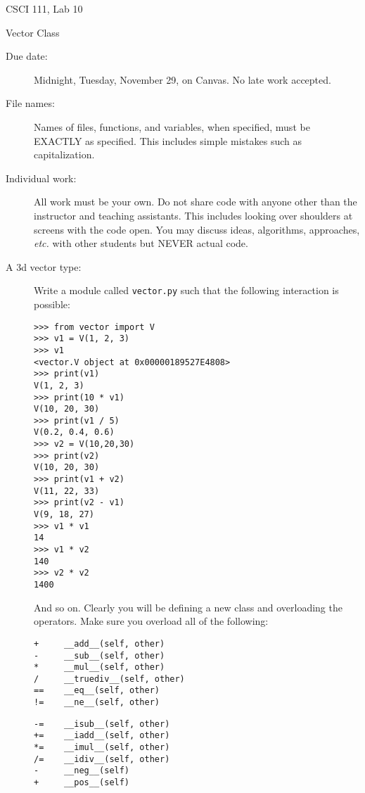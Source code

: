 \documentclass[12pt]{article}
\begin{document}
\sloppy
\centerline{\Large CSCI 111, Lab 10}
\centerline{\large Vector Class}


\begin{description}
\item[Due date:] Midnight, Tuesday, November 29, on Canvas.
No late work accepted.  

\item[File names:]  Names of files, functions, and variables, 
when specified,
must be EXACTLY as specified.  This includes simple mistakes such
as capitalization.

\item[Individual work:]  All work must be your own.  Do not share
code with anyone other than the instructor and teaching assistants.
This includes looking over shoulders at screens with the code open.
You may discuss ideas, algorithms, approaches, {\em etc.} with
other students but NEVER actual code.

\item[A 3d vector type:] Write a module called 
\lstinline{vector.py} such that the following
interaction is possible:

\begin{lstlisting}
>>> from vector import V
>>> v1 = V(1, 2, 3)
>>> v1
<vector.V object at 0x00000189527E4808>
>>> print(v1)
V(1, 2, 3)
>>> print(10 * v1)
V(10, 20, 30)
>>> print(v1 / 5)
V(0.2, 0.4, 0.6)
>>> v2 = V(10,20,30)
>>> print(v2)
V(10, 20, 30)
>>> print(v1 + v2)
V(11, 22, 33)
>>> print(v2 - v1)
V(9, 18, 27)
>>> v1 * v1
14
>>> v1 * v2
140
>>> v2 * v2
1400
\end{lstlisting}

And so on.  Clearly you will be defining a new
class and overloading
the operators.  Make sure you overload
all of the following:

\begin{minipage}{0.4\textwidth}
\begin{verbatim}
+     __add__(self, other)
-     __sub__(self, other)
*     __mul__(self, other)
/     __truediv__(self, other)
==    __eq__(self, other)
!=    __ne__(self, other)
\end{verbatim}
\end{minipage}\hfill
\begin{minipage}{0.4\textwidth}
\begin{verbatim}
-=    __isub__(self, other)
+=    __iadd__(self, other)
*=    __imul__(self, other)
/=    __idiv__(self, other)
-     __neg__(self)
+     __pos__(self)
\end{verbatim}
\end{minipage}


\end{description}
\end{document}
